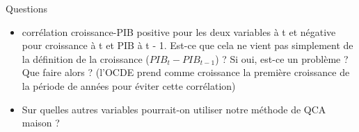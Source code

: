 \documentclass[xcolor=x11names,french]{beamer}
\renewcommand{\(}{\begin{columns}}
\renewcommand{\)}{\end{columns}}
\newcommand{\<}[1]{\begin{column}{#1}}
\renewcommand{\>}{\end{column}}
\begin{document}
\begin{frame}{Questions}

\begin{itemize}
\item corrélation croissance-PIB positive pour les deux variables à t et négative pour croissance à t et PIB à t - 1. Est-ce que cela ne vient pas simplement de la définition de la croissance ($PIB_t - PIB_{t - 1}$) ? Si oui, est-ce un problème ? Que faire alors ? (l'OCDE prend comme croissance la première croissance de la période de  années pour éviter cette corrélation)
\item Sur quelles autres variables pourrait-on utiliser notre méthode de QCA maison ? 
\end{itemize}

\end{frame}
\end{document}
